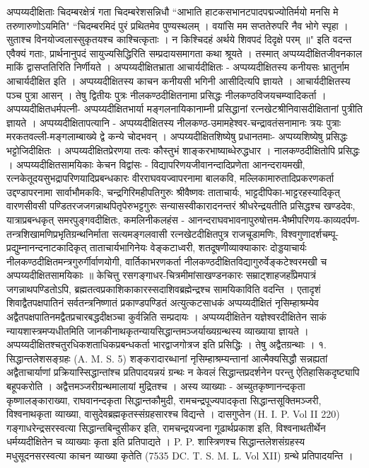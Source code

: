 अप्पय्यदीक्षिताः चिदम्बरक्षेत्रं गता चिदम्बरेशसन्निधौ ``आभाति हाटकसभानटपादपद्मज्योतिर्मयो मनसि मे तरुणारुणोऽयमिति" 
``चिदम्बरमिदं पुरं प्रथितमेव पुण्यस्थलम् ।
वयांसि मम सप्ततेरुपरि नैव भोगे स्पृहा ।
सुताश्च विनयोज्वलास्सुकृतयश्च काश्चित्कृताः ।
न किश्चिदहं अर्थये शिवपदं दिदृक्षे परम् ॥"
इति वदन्त एवैक्यं गताः, प्रार्थनानुपदं सायुज्यसिद्धिरिति सम्प्रदायसमागता कथा श्रूयते । तस्मात् अप्पय्यदीक्षितजीवनकाल माकिं द्वासप्ततिरिति निर्णीयते ।
अप्पय्यदीक्षितभ्राता आचार्यदीक्षितः -
अप्पय्यदीक्षितस्य कनीयसः भ्रातुर्नाम आचार्यदीक्षित इति । अप्पय्यदीक्षितस्य काचन कनीयसी भगिनी आसीदित्यपि ज्ञायते । आचार्यदीक्षितस्य पञ्च पुत्रा आसन् । तेषु द्वितीयः पुत्रः नीलकण्ठदीक्षितनामा प्रसिद्धः नीलकण्ठविजयचम्प्वादिकर्ता । 
अप्पय्यदीक्षितधर्मपत्नी-
अप्पय्यदीक्षितभार्या मङ्गलनायिकानाम्नी प्रसिद्धानां रत्नखेटश्रीनिवासदीक्षितानां पुत्रीति ज्ञायते ।
अप्पय्यदीक्षितापत्यानि -
अप्पय्यदीक्षितस्य नीलकण्ठ-उमामहेश्वर-चन्द्रावतंसनामानः त्रयः पुत्राः मरकतवल्ली-मङ्गलाम्बाख्ये द्वे कन्ये चोदभवन् ।
अप्पय्यदीक्षितशिष्येषु प्रधानतमाः-
अप्पय्यशिष्येषु प्रसिद्धः भट्टोजिदीक्षितः । अप्पय्यदीक्षितप्रेरणया तत्वः कौस्तुभं शाङ्करभाष्याब्धेरुद्धधार । नालकण्ठदीक्षितोपि प्रसिद्धः ।
अप्पय्यदीक्षितसामयिकाः केचन विद्वांसः -
विद्यापरिणयजीवानन्दादिप्रणेता आनन्दरायमखी, रत्नकेतूदयसुभद्रापरिणयादिप्रबन्धकारः वीरराघवयज्वापरनामा बालकवि, मल्लिकामारुतादिप्रकरणकर्ता उद्दण्डापरनामा सार्वाभौमकविः, चन्द्रगिरिमहीपतिगुरुः श्रीवैष्णवः ताताचार्यः, भाट्टदीपिका-भाट्टरहस्यादिकृत् वारणसीवसी पण्डितरजजगन्नाथपितृपेरुभट्टगुरुः सन्यासस्वीकारादनन्तरं श्रीधरेन्द्रयतीति प्रसिद्धश्च खण्डदेवः, यात्राप्रबन्धकृत् समरपुङ्गवदीक्षितः, कमलिनीकलहंस - आनन्दराघवभावनापुरुषोत्तम-भैष्मीपरिणय-काव्यदर्पण-तन्त्रशिखामणिप्रभृतिग्रन्थनिर्माता सत्यमङ्गलवासी रत्नखेटदीक्षितपुत्र राजचूडामणिः, विश्वगुणादर्शचम्पू-प्रद्युम्नानन्दनाटकादिकृत् ताताचार्यभागिनेयः वेङ्कटाध्वरी, शतदूषणीव्याक्याकारः दोड्डयाचार्यः नीलकण्ठदीक्षितमन्त्रगुरुर्गीर्वाणयोगी, वार्तिकाभरणकर्ता नीलकण्ठदीक्षितविद्यागुरुर्वेङ्कटेश्वरमखी च अप्पय्यदीक्षितसामयिकाः ॥
केचित्तु रसगङ्गाधर-चित्रमीमांसाखण्डनकारः सम्राट्शाहजहाँप्रेमपात्रं जगन्नाथपण्डितोऽपि, ब्रह्मतत्वप्रकाशिकाकारस्सदाशिवब्रह्मेन्द्रश्च सामयिकाविति वदन्ति ।
एतादृशं शिवाद्वैतपक्षपातिनं सर्वतन्त्रनिष्णातं प्रकाण्डपण्डितं अत्युत्कटसाधकं अप्पय्यदीक्षितं नृसिम्हाश्रम्येव अद्वैतपक्षपातिनमद्वैतप्रचारबद्धदीक्षञ्चा कुर्वन्निति सम्प्रदायः । अप्पय्यदीक्षितेन यज्ञेश्वरदीक्षितेन साकं न्यायशास्त्रमप्यधीतमिति जानकीनाथकृतन्यायसिद्धान्तमञ्जर्याख्यग्रन्थस्य व्याख्याया ज्ञायते । अप्पय्यदीक्षितश्चतुरधिकशताधिकप्रबन्धकर्ता भारद्वाजगोत्रज इति प्रसिद्धिः । तेषु अद्वैतग्रन्थाः ।
१. सिद्धान्तलेशसङ्ग्रहः (A. M. S. 5)
शङ्करादारब्धानां नृसिम्हाश्रम्यन्तानां आत्मैक्यसिद्धौ सन्नह्यतां अद्वैताचार्याणां प्रक्रियास्सिद्धान्तांश्च प्रतिपादयन्नयं ग्रन्थः न केवलं सिद्धान्तप्रदर्शनेन परन्तु ऐतिहासिकदृष्ट्यापि बहूपकरोति । अद्वैत्तमञ्जरीग्रन्थमालायां मुद्रितश्च । अस्य व्याख्याः - अच्युतकृष्णानन्दकृता कृष्णालङ्काराख्या, राघवानन्दकृता सिद्धान्तकौमुदी, रामचन्द्रपूज्यपादकृता सिद्धान्तसूक्तिमञ्जरी, विश्वनाथकृता व्याख्या, वासुदेवब्रह्मकृतस्संग्रहसारश्च विद्यन्ते । दासगुप्तेन (H. I. P. Vol II 220) गङ्गाधरेन्द्रसरस्वत्या सिद्धान्तबिन्दुसीकर इति, रामचन्द्रयज्वना गूढार्थप्रकाश इति, विश्वनाथतीर्थेन धर्मय्यदीक्षितेन च व्याख्याः कृता इति प्रतिपाद्यते । P. P. शास्त्रिणश्च सिद्धान्तलेशसंग्रहस्य मधुसूदनसरस्वत्या काचन व्याख्या कृतेति (7535 DC. T. S. M. L. Vol XII) ग्रन्थे प्रतिपादयन्ति ।
